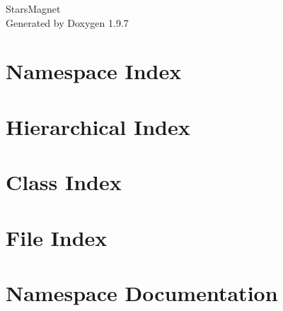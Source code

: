 \documentclass[twoside]{book}
\newcommand{\+}{\discretionary{\mbox{\scriptsize$\hookleftarrow$}}{}{}}
\newcommand{\clearemptydoublepage}{%
    \newpage{\pagestyle{empty}\cleardoublepage}%
  }
\begin{document}
  \raggedbottom
    \hypersetup{pageanchor=false,
                bookmarksnumbered=true,
                pdfencoding=unicode
               }
  \begin{titlepage}
  \vspace*{7cm}
  \begin{center}%
  {\Large Stars\+Magnet}\\
  \vspace*{1cm}
  {\large Generated by Doxygen 1.9.7}\\
  \end{center}
  \end{titlepage}
  \clearemptydoublepage
  \tableofcontents
  \clearemptydoublepage
  \hypersetup{pageanchor=true}

\chapter{Namespace Index}

\chapter{Hierarchical Index}

\chapter{Class Index}

\chapter{File Index}

\chapter{Namespace Documentation}






















\end{document}
